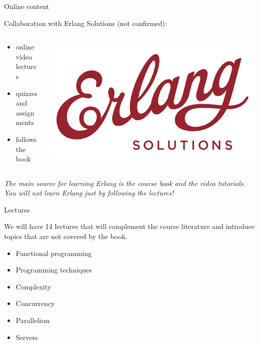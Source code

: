 \begin{frame}{Online content}

   Collaboration with Erlang Solutions (not confirmed):

\begin{columns}
 \begin{column}{0.6\linewidth}
  \begin{itemize}
       \item online video lectures
       \item quizzes and assignments 
       \item follows the book
  \end{itemize}
 \end{column}
 \begin{column}{0.4\linewidth}
  \includegraphics[width=\linewidth]{logo.png}
 \end{column}
\end{columns}

\vspace{20pt}
{\em The main source for learning Erlang is the course book and the
video tutorials. You will not learn Erlang just by following the
lectures!}

\end{frame}


\begin{frame}{Lectures}

   We will have 14 lectures that will complement the course literature
   and introduce topics that are not covered by the book.

  \begin{itemize}
    \item Functional programming
\pause
    \item Programming techniques
\pause
    \item Complexity 
\pause
    \item Concurrency 
\pause
    \item Parallelism
\pause
    \item Servers
  \end{itemize}
\end{frame}


